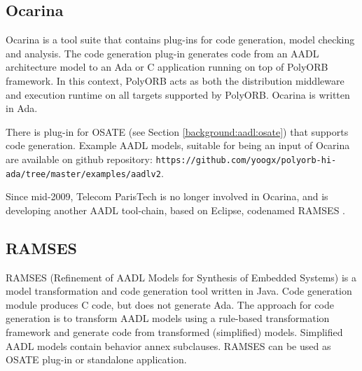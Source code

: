\subsection{Ocarina}
\label{background:codegen:ocarina}

Ocarina \cite{Ocarina:Paper} is a tool suite that contains plug-ins for code generation, model checking and analysis. The code generation plug-in generates code from an AADL architecture model to an Ada or C application running on top of PolyORB framework. In this context, PolyORB acts as both the distribution middleware and execution runtime on all targets supported by PolyORB. Ocarina is written in Ada.

There is plug-in for OSATE (see Section \ref{background:aadl:osate}) that supports code generation. Example AADL models, suitable for being an input of Ocarina are available on github repository: \lstinline{https://github.com/yoogx/polyorb-hi-ada/tree/master/examples/aadlv2}.

Since mid-2009, Telecom ParisTech is no longer involved in Ocarina, and is developing another AADL tool-chain, based on Eclipse, codenamed RAMSES \cite{RAMSES:Paper}.



\subsection{RAMSES}
\label{background:codegen:ramses}

RAMSES (Refinement of AADL Models for Synthesis of Embedded Systems) \cite{RAMSES:Paper} is a model transformation and code generation tool written in Java. Code generation module produces C code, but does not generate Ada. The approach for code generation is to transform AADL models using a rule-based transformation framework and generate code from transformed (simplified) models. Simplified AADL models contain behavior annex subclauses. RAMSES can be used as OSATE plug-in or standalone application.

